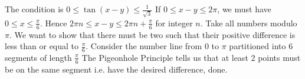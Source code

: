\documentclass{article}
\begin{document}
The condition is \newline
$0\le \tan(x-y)\le \frac{1}{\sqrt{3}}$ \newline
If $0\le x-y\le 2\pi$, we must have $0\le x\le \frac{\pi}{6}$. \newline Hence $2\pi n\le x-y\le 2\pi n+\frac{\pi}{6}$ for integer $n$. \newline
Take all numbers modulo $\pi$. We want to show that there must be two such that their positive difference is less than or equal to $\frac{\pi}{6}$. \newline
Consider the number line from $0$ to $\pi$ partitioned into $6$ segments of length $\frac{\pi}{6}$ \newline
The Pigeonhole Principle tells us that at least 2 points must be on the same segment i.e. have the desired difference, done.
\end{document}
